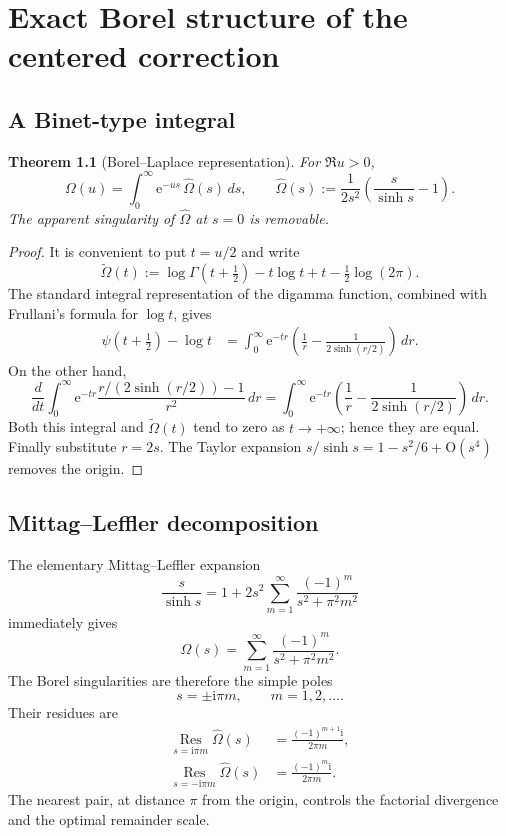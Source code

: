 \documentclass[11pt,a4paper,oneside]{book}
\newtheorem{theorem}{Theorem}[chapter]
\newcommand{\e}{\mathrm e}
\newcommand{\ii}{\mathrm i}
\newcommand{\Res}{\operatorname*{Res}}
\newcommand{\Ord}{\mathrm O}
\begin{document}
\chapter{Exact Borel structure of the centered correction}

\section{A Binet-type integral}

\begin{theorem}[Borel--Laplace representation]\label{thm:borel}
For \(\Re u>0\),
\begin{equation}\label{eq:borel-laplace}
 \Omega(u)
 =\int_0^\infty \e^{-us}\,\widehat\Omega(s)\,ds,
 \qquad
 \widehat\Omega(s)
 :=\frac{1}{2s^2}\left(\frac{s}{\sinh s}-1\right).
\end{equation}
The apparent singularity of \(\widehat\Omega\) at \(s=0\) is removable.
\end{theorem}

\begin{proof}
It is convenient to put \(t=u/2\) and write
\[
 \widetilde\Omega(t)
 :=\log\Gamma(t+\tfrac12)-t\log t+t-\tfrac12\log(2\pi).
\]
The standard integral representation of the digamma function, combined with
Frullani's formula for \(\log t\), gives
\begin{align*}
 \psi(t+\tfrac12)-\log t
 &=\int_0^\infty \e^{-tr}
 \left(\frac1r-\frac{1}{2\sinh(r/2)}\right)\,dr.
\end{align*}
On the other hand,
\[
 \frac{d}{dt}
 \int_0^\infty \e^{-tr}
 \frac{r/(2\sinh(r/2))-1}{r^2}\,dr
 =
 \int_0^\infty \e^{-tr}
 \left(\frac1r-\frac{1}{2\sinh(r/2)}\right)\,dr.
\]
Both this integral and \(\widetilde\Omega(t)\) tend to zero as
\(t\to+\infty\); hence they are equal.  Finally substitute \(r=2s\).
The Taylor expansion \(s/\sinh s=1-s^2/6+\Ord(s^4)\) removes the origin.
\end{proof}

\section{Mittag--Leffler decomposition}

The elementary Mittag--Leffler expansion
\begin{equation}\label{eq:mittag}
 \frac{s}{\sinh s}
 =1+2s^2\sum_{m=1}^\infty
 \frac{(-1)^m}{s^2+\pi^2m^2}
\end{equation}
immediately gives
\begin{equation}\label{eq:borel-partial-fraction}
 \widehat\Omega(s)
 =\sum_{m=1}^\infty
 \frac{(-1)^m}{s^2+\pi^2m^2}.
\end{equation}
The Borel singularities are therefore the simple poles
\[
 s=\pm\ii\pi m,\qquad m=1,2,\ldots.
\]
Their residues are
\begin{align}
 \Res_{s=\ii\pi m}\widehat\Omega(s)
 &=\frac{(-1)^{m+1}\ii}{2\pi m},\label{eq:res-plus}\\
 \Res_{s=-\ii\pi m}\widehat\Omega(s)
 &=\frac{(-1)^m\ii}{2\pi m}.\label{eq:res-minus}
\end{align}
The nearest pair, at distance \(\pi\) from the origin, controls the
factorial divergence and the optimal remainder scale.
\end{document}
